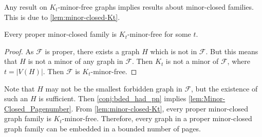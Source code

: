 Any result on $K_t$-minor-free graphs implies results about minor-closed families. This is due to \cref{lem:minor-closed-Kt}. 

\begin{lemma}\label{lem:minor-closed-Kt}
    Every proper minor-closed family is $K_t$-minor-free for some $t$. 
\end{lemma}
\begin{proof}
    As $\mathcal{F}$ is proper, there exists a graph $H$ which is not in $\mathcal{F}$. But this means that $H$ is not a minor of any graph in $\mathcal{F}$. Then $K_t$ is not a minor of $\mathcal{F}$, where $t = |V(H)|$. Then $\mathcal{F}$ is $K_t$-minor-free. 
\end{proof}
Note that $H$ may not be the smallest forbidden graph in $\mathcal{F}$, but the existence of such an $H$ is sufficient. 
Then \cref{conj:bded_had_pn} implies \cref{lem:Minor-Closed_Pagenumber}. From \cref{lem:minor-closed-Kt}, every proper minor-closed graph family is $K_t$-minor-free. Therefore, every graph in a proper minor-closed graph family can be embedded in a bounded number of pages.
